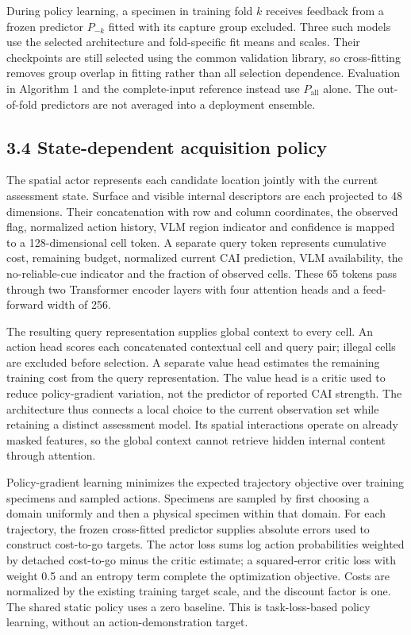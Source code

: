 During policy learning, a specimen in training fold \(k\) receives feedback from a frozen predictor \(P_{-k}\) fitted with its capture group excluded. Three such models use the selected architecture and fold-specific fit means and scales. Their checkpoints are still selected using the common validation library, so cross-fitting removes group overlap in fitting rather than all selection dependence. Evaluation in Algorithm 1 and the complete-input reference instead use \(P_{\mathrm{all}}\) alone. The out-of-fold predictors are not averaged into a deployment ensemble.

\subsection{3.4 State-dependent acquisition policy}\label{state-dependent-acquisition-policy}

The spatial actor represents each candidate location jointly with the current assessment state. Surface and visible internal descriptors are each projected to 48 dimensions. Their concatenation with row and column coordinates, the observed flag, normalized action history, VLM region indicator and confidence is mapped to a 128-dimensional cell token. A separate query token represents cumulative cost, remaining budget, normalized current CAI prediction, VLM availability, the no-reliable-cue indicator and the fraction of observed cells. These 65 tokens pass through two Transformer encoder layers \citep{vaswani2017} with four attention heads and a feed-forward width of 256.

The resulting query representation supplies global context to every cell. An action head scores each concatenated contextual cell and query pair; illegal cells are excluded before selection. A separate value head estimates the remaining training cost from the query representation. The value head is a critic used to reduce policy-gradient variation, not the predictor of reported CAI strength. The architecture thus connects a local choice to the current observation set while retaining a distinct assessment model. Its spatial interactions operate on already masked features, so the global context cannot retrieve hidden internal content through attention.

Policy-gradient learning \citep{williams1992} minimizes the expected trajectory objective over training specimens and sampled actions. Specimens are sampled by first choosing a domain uniformly and then a physical specimen within that domain. For each trajectory, the frozen cross-fitted predictor supplies absolute errors used to construct cost-to-go targets. The actor loss sums log action probabilities weighted by detached cost-to-go minus the critic estimate; a squared-error critic loss with weight 0.5 and an entropy term complete the optimization objective. Costs are normalized by the existing training target scale, and the discount factor is one. The shared static policy uses a zero baseline. This is task-loss-based policy learning, without an action-demonstration target.

